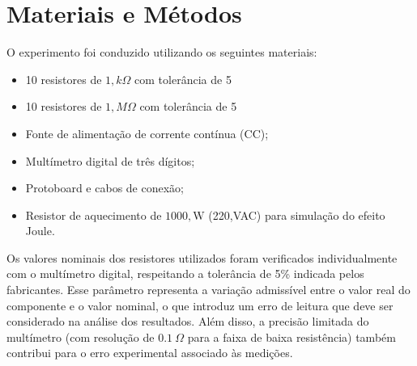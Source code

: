 \documentclass[conference]{IEEEtran}
\begin{document}





\section{Materiais e Métodos}

O experimento foi conduzido utilizando os seguintes materiais:

\begin{itemize}
    \item 10 resistores de $1,k\Omega$ com tolerância de 5%
    \item 10 resistores de $1,M\Omega$ com tolerância de 5%
    \item Fonte de alimentação de corrente contínua (CC);
    \item Multímetro digital de três dígitos;
    \item Protoboard e cabos de conexão;
    \item Resistor de aquecimento de $1000,\text{W}$ (220,VAC) para simulação do efeito Joule.
\end{itemize}

Os valores nominais dos resistores utilizados foram verificados individualmente com o multímetro digital, respeitando a tolerância de 5\% indicada pelos fabricantes. Esse parâmetro representa a variação admissível entre o valor real do componente e o valor nominal, o que introduz um erro de leitura que deve ser considerado na análise dos resultados. Além disso, a precisão limitada do multímetro (com resolução de $0.1~\Omega$ para a faixa de baixa resistência) também contribui para o erro experimental associado às medições.
\end{document}
